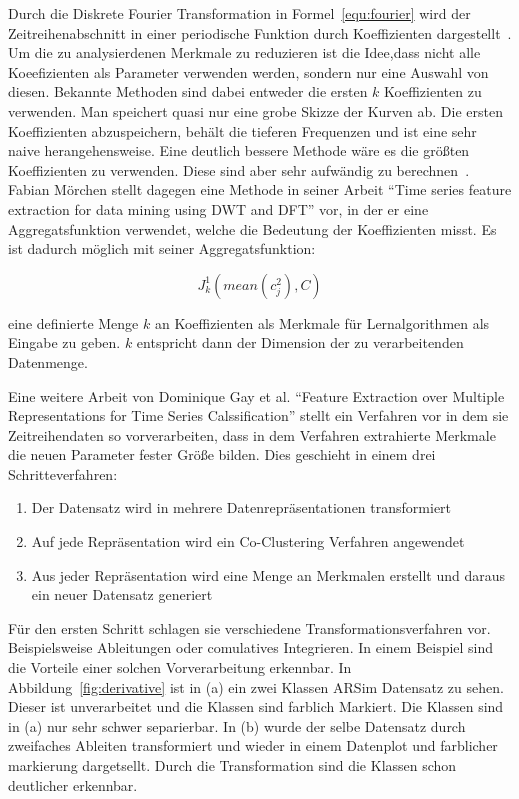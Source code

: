 Durch die Diskrete Fourier Transformation in Formel\ \ref{equ:fourier} wird der Zeitreihenabschnitt in einer periodische Funktion durch Koeffizienten dargestellt~\cite{Butz2012}. Um die zu analysierdenen Merkmale zu reduzieren ist die Idee,dass nicht alle Koeefizienten als Parameter verwenden werden, sondern nur eine Auswahl von diesen. Bekannte Methoden sind dabei entweder die ersten $k$ Koeffizienten zu verwenden. Man speichert quasi nur eine grobe Skizze der Kurven ab. Die ersten Koeffizienten abzuspeichern, behält die tieferen Frequenzen und ist eine sehr naive herangehensweise. Eine deutlich bessere Methode wäre es die größten Koeffizienten zu verwenden. Diese sind aber sehr aufwändig zu berechnen~\cite{morchen2003time}. Fabian Mörchen stellt dagegen eine Methode in seiner Arbeit \enquote{Time series feature extraction for data mining using DWT and DFT} vor, in der er eine Aggregatsfunktion verwendet, welche die Bedeutung der Koeffizienten misst. Es ist dadurch möglich mit seiner Aggregatsfunktion:

\begin{equation}
  J_k^1(mean(c_j^2), C)
  \label{equ:aggregatefunction}
\end{equation}

eine definierte Menge $k$ an Koeffizienten als Merkmale für Lernalgorithmen als Eingabe zu geben. $k$ entspricht dann der Dimension der zu verarbeitenden Datenmenge. 

Eine weitere Arbeit von Dominique Gay et al. \enquote{Feature Extraction over Multiple Representations for Time Series Calssification} stellt ein Verfahren vor in dem sie Zeitreihendaten so vorverarbeiten, dass in dem Verfahren extrahierte Merkmale die neuen Parameter fester Größe bilden. Dies geschieht in einem drei Schritteverfahren:

\begin{enumerate}
  \item Der Datensatz wird in mehrere Datenrepräsentationen transformiert
  \item Auf jede Repräsentation wird ein Co-Clustering Verfahren angewendet
  \item Aus jeder Repräsentation wird eine Menge an Merkmalen erstellt und daraus ein neuer Datensatz generiert
\end{enumerate}

Für den ersten Schritt schlagen sie verschiedene Transformationsverfahren vor. Beispielsweise Ableitungen oder comulatives Integrieren. In einem Beispiel sind die Vorteile einer solchen Vorverarbeitung erkennbar. In Abbildung\ \ref{fig:derivative} ist in (a) ein zwei Klassen ARSim Datensatz zu sehen. Dieser ist unverarbeitet und die Klassen sind farblich Markiert. Die Klassen sind in (a) nur sehr schwer separierbar. In (b) wurde der selbe Datensatz durch zweifaches Ableiten transformiert und wieder in einem Datenplot und farblicher markierung dargetsellt. Durch die Transformation sind die Klassen schon deutlicher erkennbar.

